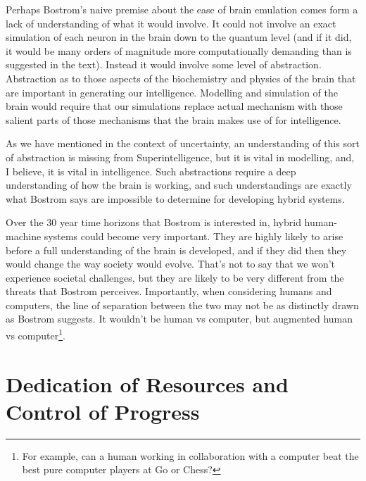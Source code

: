 \documentclass[a4paper]{caesar_book}
\begin{document}
Perhaps Bostrom’s naive premise about the ease of brain emulation comes form a lack of understanding of what it would involve. It could not involve an exact simulation of each neuron in the brain down to the quantum level (and if it did, it would be many orders of magnitude more computationally demanding than is suggested in the text). Instead it would involve some level of abstraction. Abstraction as to those aspects of the biochemistry and physics of the brain that are important in generating our intelligence. Modelling and simulation of the brain would require that our simulations replace actual mechanism with those salient parts of those mechanisms that the brain makes use of for intelligence.

As we have mentioned in the context of uncertainty, an understanding of this sort of abstraction is missing from Superintelligence, but it is vital in modelling, and, I believe, it is vital in intelligence. Such abstractions require a deep understanding of how the brain is working, and such understandings are exactly what Bostrom says are impossible to determine for developing hybrid systems.

Over the 30 year time horizons that Bostrom is interested in, hybrid human-machine systems could become very important. They are highly likely to arise before a full understanding of the brain is developed, and if they did then they would change the way society would evolve. That’s not to say that we won’t experience societal challenges, but they are likely to be very different from the threats that Bostrom perceives. Importantly, when considering humans and computers, the line of separation between the two may not be as distinctly drawn as Bostrom suggests. It wouldn’t be human vs computer, but augmented human vs computer\footnote{For example, can a human working in collaboration with a computer beat the best pure computer players at Go or Chess?}.

\section{Dedication of Resources and Control of Progress}
\end{document}
